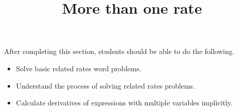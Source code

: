 \documentclass{ximera}
\title{More than one rate}
\begin{document}
\begin{abstract}
\end{abstract}

\maketitle

\begin{sectionOutcomes}

After completing this section, students should be able to do the following.

\begin{itemize}
\item Solve basic related rates word problems.
\item Understand the process of solving related rates problems.
\item Calculate derivatives of expressions with multiple variables implicitly.
\end{itemize}

\end{sectionOutcomes}
\end{document}
